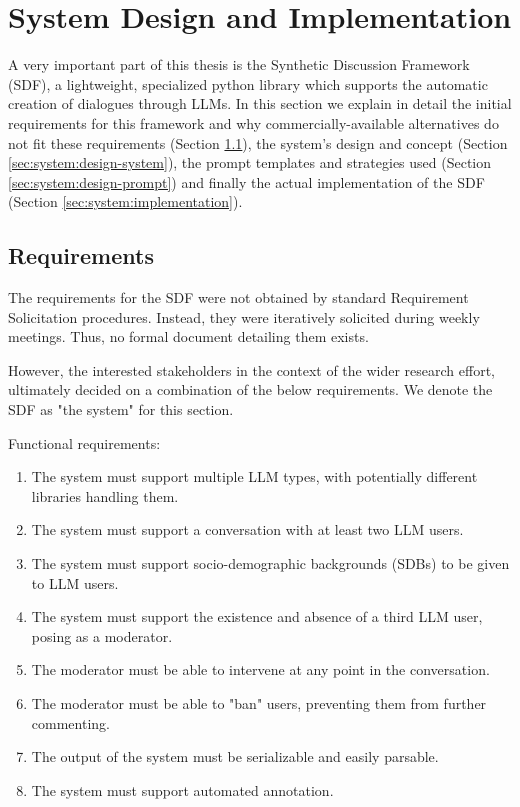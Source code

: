 %
\chapter{System Design and Implementation}
\label{sec:system}

A very important part of this thesis is the Synthetic Discussion Framework (SDF), a lightweight, specialized python library which supports the automatic creation of dialogues through LLMs. In this section we explain in detail the initial requirements for this framework and why commercially-available alternatives do not fit these requirements (Section \ref{sec:system:requirements}), the system's design and concept (Section \ref{sec:system:design-system}), the prompt templates and strategies used (Section \ref{sec:system:design-prompt}) and finally the actual implementation of the SDF (Section \ref{sec:system:implementation}).

\section{Requirements}
\label{sec:system:requirements}


The requirements for the SDF were not obtained by standard Requirement Solicitation procedures. Instead, they were iteratively solicited during weekly meetings. Thus, no formal document detailing them exists. 

However, the interested stakeholders in the context of the wider research effort, ultimately decided on a combination of the below requirements. We denote the SDF as "the system" for this section.

Functional requirements:
\begin{enumerate}
	\item The system must support multiple LLM types, with potentially different libraries handling them.
	\item The system must support a conversation with at least two LLM users.
	\item The system must support socio-demographic backgrounds (SDBs) to be given to LLM users.
	\item The system must support the existence and absence of a third LLM user, posing as a moderator.
	\item The moderator must be able to intervene at any point in the conversation.
	\item The moderator must be able to "ban" users, preventing them from further commenting.
	\item The output of the system must be serializable and easily parsable.
	\item The system must support automated annotation.
\end{enumerate}

